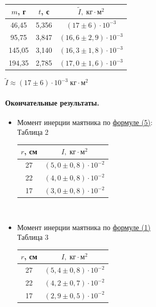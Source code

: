 \documentclass{article}
\begin{document}
\begin{itemize}
\begin{tabular}{c|c||c||}
	
	$m$, г& $t$, с &$\tilde I{,}\;\mbox{кг}\cdot\mbox{м}^2$\\
	\hline
	46,45& 5,356& $(17\pm6)\cdot10^{-3}$\\
	
	95,75& 3,847 &$(16,6\pm2,9)\cdot10^{-3}$\\
	
	145,05& 3,140& $(16,3\pm1,8)\cdot10^{-3}$\\
	
	194,35& 2,785& $(17,0\pm1,6)\cdot10^{-3}$\\
\end{tabular}

$\tilde{I}\approx(17\pm6)\cdot10^{-3}\;\mbox{кг}\cdot\mbox{м}^2$
\end{itemize}

\paragraph{Окончательные результаты.}
\begin{itemize}
	\item Момент инерции маятника по \hyperlink{formuls}{формуле (5)}:\\
	
Таблица 2\\
	\begin{tabular}{|c|c|}
		\hline
		$r$, см&  $I{,}\;\mbox{кг}\cdot\mbox{м}^2$\\
		\hline
		27& $(5,0\pm0,8)\cdot10^{-2}$ \\
		
		22&  $(4,0\pm0,8)\cdot10^{-2}$\\
	
		17&  $(3,0\pm0,8)\cdot10^{-2}$\\
		\hline
	\end{tabular}\\

	\item Момент инерции маятника по \hyperlink{formuls}{формуле (1)}\\

Таблица 3\\
	\begin{tabular}{|c|c|}
		\hline
		$r$, см&  $I{,}\;\mbox{кг}\cdot\mbox{м}^2$\\
		\hline
		27& $ (5,4\pm0,8)\cdot10^{-2}$ \\
		
		22&  $ (4,2\pm0,7)\cdot10^{-2}$\\
		
		17&  $ (2,9\pm0,5)\cdot10^{-2}$\\
		\hline
	\end{tabular}
\end{itemize}
\end{document}

